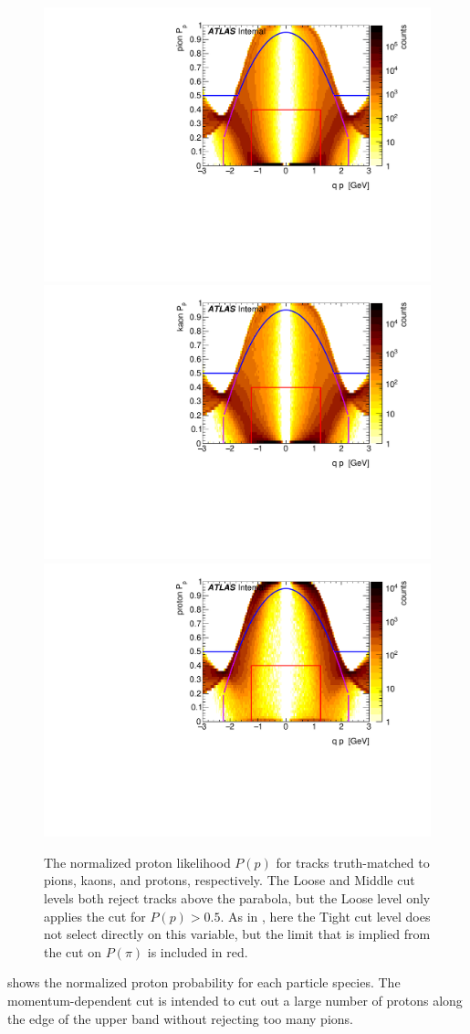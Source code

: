 \begin{figure}[t]
\includegraphics[width=.32\linewidth]{P_pion_p.pdf}
\includegraphics[width=.32\linewidth]{P_kaon_p.pdf}
\includegraphics[width=.32\linewidth]{P_proton_p.pdf}
\caption{The normalized proton likelihood $P(p)$ for tracks truth-matched to pions, kaons, and protons, respectively. The Loose and Middle cut levels both reject tracks above the parabola, but the Loose level only applies the cut for $P(p) > 0.5$. As in , here the Tight cut level does not select directly on this variable, but the limit that is implied from the cut on $P(\pi)$ is included in red.}
\label{fig:prob_p}
\end{figure}

 shows the normalized proton probability for each particle species.
The momentum-dependent cut is intended to cut out a large number of protons along the edge of the upper band without rejecting too many pions.

